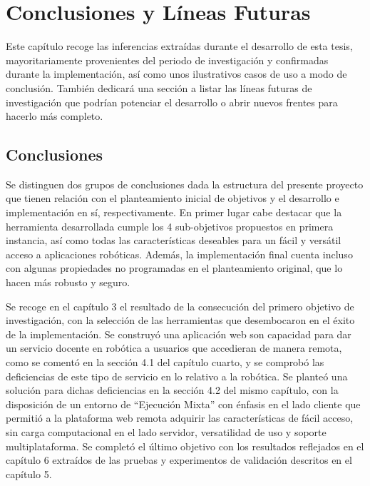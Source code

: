 \chapter{Conclusiones y Líneas Futuras}

Este capítulo recoge las inferencias extraídas durante el desarrollo de esta tesis, mayoritariamente provenientes del periodo de investigación y confirmadas durante la implementación, así como unos ilustrativos casos de uso a modo de conclusión. También dedicará una sección a listar las líneas futuras de investigación que podrían potenciar el desarrollo o abrir nuevos frentes para hacerlo más completo.

\section{Conclusiones} 

Se distinguen dos grupos de conclusiones dada la estructura del presente proyecto que tienen relación con el planteamiento inicial de objetivos y el desarrollo e implementación en sí, respectivamente.
En primer lugar cabe destacar que la herramienta desarrollada cumple los 4 sub-objetivos propuestos en primera instancia, así como todas las características deseables para un fácil y versátil acceso a aplicaciones robóticas. Además, la implementación final cuenta incluso con algunas propiedades no programadas en el planteamiento original, que lo hacen más robusto y seguro.

Se recoge en el capítulo 3 el resultado de la consecución del primero objetivo de investigación, con la selección de las herramientas que desembocaron en el éxito de la implementación. Se construyó una aplicación web son capacidad para dar un servicio docente en robótica a usuarios que accedieran de manera remota, como se comentó en la sección 4.1 del capítulo cuarto, y se comprobó las deficiencias de este tipo de servicio en lo relativo a la robótica. Se planteó una solución para dichas deficiencias en la sección 4.2 del mismo capítulo, con la disposición de un entorno de ``Ejecución Mixta'' con énfasis en el lado cliente que permitió a la plataforma web remota adquirir las características de fácil acceso, sin carga computacional en el lado servidor, versatilidad de uso y soporte multiplataforma. Se completó el último objetivo con los resultados reflejados en el capítulo 6 extraídos de las pruebas y experimentos de validación descritos en el capítulo 5.

